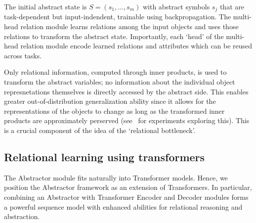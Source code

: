 
The initial abstract state is $S = (s_1,\ldots, s_m)$
with abstract symbols $s_j$ that are task-dependent but input-indendent, trainable using
backpropagation. The multi-head relation module learns relations among the input objects and uses those
relations to transform the abstract state. Importantly, each `head' of the multi-head relation module
encode learned relations and attributes which can be reused across tasks.

Only relational information, computed through inner products,
is used to transform the abstract variables; no information about the individual object represnetations themselves is directly accessed by the abstract side. This enables greater out-of-distribution generalization ability since it allows for the representations of the objects to change as long as the transformed inner products are approximately perserved (see~ for experiments exploring this). This is a crucial component of the idea of the `relational bottleneck'.



\subsection{Relational learning using transformers}

The Abstractor module fits naturally into Transformer models. Hence, we position the Abstractor framework as an extension of Transformers. In particular, combining an Abstractor with Transformer Encoder and Decoder modules forms a powerful sequence model with enhanced abilities for relational reasoning and abstraction.


